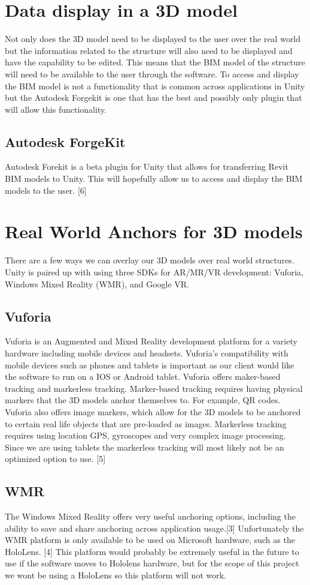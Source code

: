 \documentclass[onecolumn, draftclsnofoot,10pt, compsoc]{IEEEtran}
\begin{document}
\section{Data display in a 3D model}
Not only does the 3D model need to be displayed to the user over the real world but the information related to the structure will also need to be displayed and have the capability to be edited. This means that the BIM model of the structure will need to be available to the user through the software. To access and display the BIM model is not a functionality that is common across applications in Unity but the Autodesk Forgekit is one that has the best and possibly only plugin that will allow this functionality.
\subsection{Autodesk ForgeKit}
Autodesk Forekit is a beta plugin for Unity that allows for transferring Revit BIM models to Unity. This will hopefully allow us to access and display the BIM models to the user. [6]
\section{Real World Anchors for 3D models}
There are a few ways we can overlay our 3D models over real world structures. Unity is paired up with using three SDKs for AR/MR/VR development: Vuforia, Windows Mixed Reality (WMR), and Google VR.
\subsection{Vuforia}
Vuforia is an Augmented and Mixed Reality development platform for a variety hardware including mobile devices and headsets. Vuforia's compatibility with mobile devices such as phones and tablets is important as our client would like the software to run on a IOS or Android tablet. Vuforia offers maker-based tracking and markerless tracking. Marker-based tracking requires having physical markers that the 3D models anchor themselves to. For example, QR codes. Vuforia also offers image markers, which allow for the 3D models to be anchored to certain real life objects that are pre-loaded as images. Markerless tracking requires using location GPS, gyroscopes and very complex image processing. Since we are using tablets the markerless tracking will most likely not be an optimized option to use. [5]
\subsection{WMR}
The Windows Mixed Reality offers very useful anchoring options, including the ability to save and share anchoring across application usage.[3] Unfortunately the WMR platform is only available to be used on Microsoft hardware, such as the HoloLens. [4] This platform would probably be extremely useful in the future to use if the software moves to Hololens hardware, but for the scope of this project we wont be using a HoloLens so this platform will not work.
\end{document}
